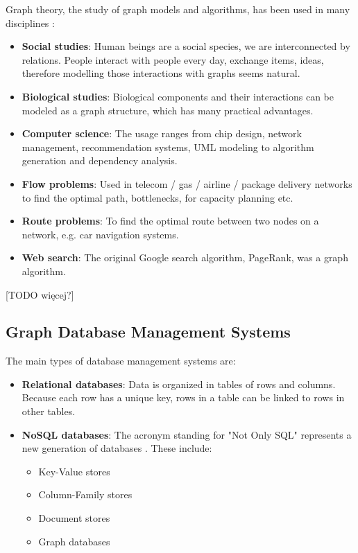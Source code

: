 \documentclass[12pt]{report}
\begin{document}
Graph theory, the study of graph models and algorithms, has been used in many disciplines \cite{learning_neo4j}:
\begin{itemize}
\item {\bf Social studies}: Human beings are a social species, we are interconnected by relations. People interact with people every day, exchange items, ideas, therefore modelling those interactions with graphs seems natural.
\item {\bf Biological studies}: Biological components and their interactions can be modeled as a graph structure, which has many practical advantages.
\item {\bf Computer science}: The usage ranges from chip design, network management, recommendation systems, UML modeling to algorithm generation and dependency analysis.
\item {\bf Flow problems}: Used in telecom / gas / airline / package delivery networks to find the optimal path, bottlenecks, for capacity planning etc. 
\item {\bf Route problems}: To find the optimal route between two nodes on a network, e.g. car navigation systems.
\item {\bf Web search}: The original Google search algorithm, PageRank, was a graph algorithm.
\end{itemize}

[TODO więcej?]

\subsection{Graph Database Management Systems}

The main types of database management systems are:
\begin{itemize}
\item {\bf Relational databases}: Data is organized in tables of rows and columns. Because each row has a unique key, rows in a table can be linked to rows in other tables.
\item {\bf NoSQL databases}: The acronym standing for "Not Only SQL" represents a new generation of databases \cite{learning_neo4j}. These include:
\begin{itemize}
\item Key-Value stores
\item Column-Family stores
\item Document stores
\item Graph databases
\end{itemize}
\end{itemize}
\end{document}
